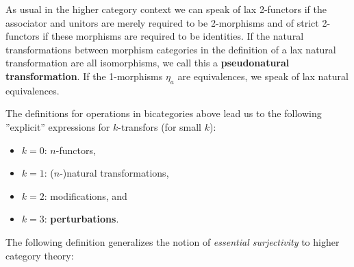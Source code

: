     \begin{remark}
        As usual in the higher category context we can speak of lax 2-functors if the associator and unitors are merely required to be 2-morphisms and of strict 2-functors if these morphisms are required to be identities. If the natural transformations between morphism categories in the definition of a lax natural transformation are all isomorphisms, we call this a  \textbf{pseudonatural transformation}. If the 1-morphisms $\eta_a$ are equivalences, we speak of lax natural equivalences.
    \end{remark}


    \begin{example}
        The definitions for operations in bicategories above lead us to the following ''explicit'' expressions for $k$-transfors (for small $k$):
        \begin{itemize}
            \item $k=0$: $n$-functors,
            \item $k=1$: ($n$-)natural transformations,
            \item $k=2$: modifications, and
            \item $k=3$: \textbf{perturbations}.
        \end{itemize}
    \end{example}

    The following definition generalizes the notion of \textit{essential surjectivity} to higher category theory:

